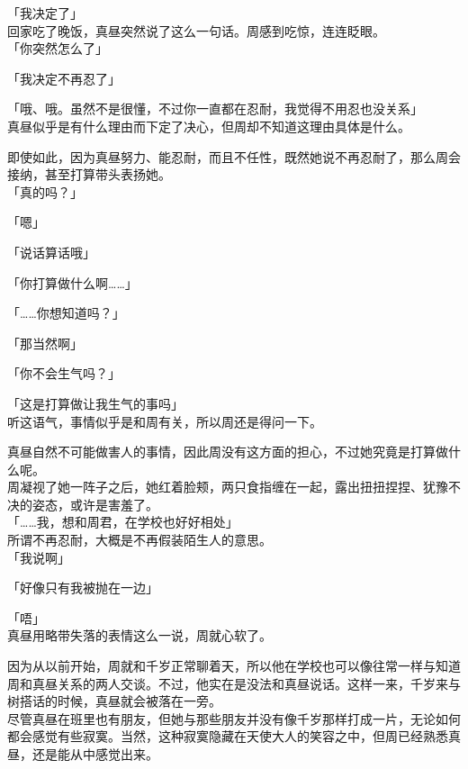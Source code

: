 「我决定了」\\

回家吃了晚饭，真昼突然说了这么一句话。周感到吃惊，连连眨眼。\\

「你突然怎么了」

「我决定不再忍了」

「哦、哦。虽然不是很懂，不过你一直都在忍耐，我觉得不用忍也没关系」\\

真昼似乎是有什么理由而下定了决心，但周却不知道这理由具体是什么。

即使如此，因为真昼努力、能忍耐，而且不任性，既然她说不再忍耐了，那么周会接纳，甚至打算带头表扬她。\\

「真的吗？」

「嗯」

「说话算话哦」

「你打算做什么啊……」

「……你想知道吗？」

「那当然啊」

「你不会生气吗？」

「这是打算做让我生气的事吗」\\

听这语气，事情似乎是和周有关，所以周还是得问一下。

真昼自然不可能做害人的事情，因此周没有这方面的担心，不过她究竟是打算做什么呢。\\

周凝视了她一阵子之后，她红着脸颊，两只食指缠在一起，露出扭扭捏捏、犹豫不决的姿态，或许是害羞了。\\

「……我，想和周君，在学校也好好相处」\\

所谓不再忍耐，大概是不再假装陌生人的意思。\\

「我说啊」

「好像只有我被抛在一边」

「唔」\\

真昼用略带失落的表情这么一说，周就心软了。

因为从以前开始，周就和千岁正常聊着天，所以他在学校也可以像往常一样与知道周和真昼关系的两人交谈。不过，他实在是没法和真昼说话。这样一来，千岁来与树搭话的时候，真昼就会被落在一旁。\\

尽管真昼在班里也有朋友，但她与那些朋友并没有像千岁那样打成一片，无论如何都会感觉有些寂寞。当然，这种寂寞隐藏在天使大人的笑容之中，但周已经熟悉真昼，还是能从中感觉出来。\\

